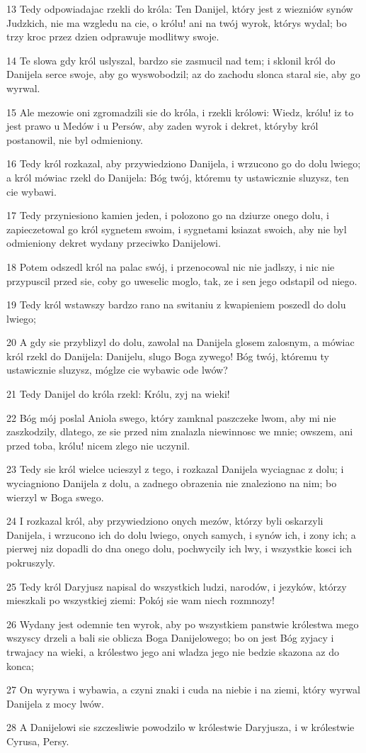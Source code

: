 \par 13 Tedy odpowiadajac rzekli do króla: Ten Danijel, który jest z wiezniów synów Judzkich, nie ma wzgledu na cie, o królu! ani na twój wyrok, którys wydal; bo trzy kroc przez dzien odprawuje modlitwy swoje.
\par 14 Te slowa gdy król uslyszal, bardzo sie zasmucil nad tem; i sklonil król do Danijela serce swoje, aby go wyswobodzil; az do zachodu slonca staral sie, aby go wyrwal.
\par 15 Ale mezowie oni zgromadzili sie do króla, i rzekli królowi: Wiedz, królu! iz to jest prawo u Medów i u Persów, aby zaden wyrok i dekret, któryby król postanowil, nie byl odmieniony.
\par 16 Tedy król rozkazal, aby przywiedziono Danijela, i wrzucono go do dolu lwiego; a król mówiac rzekl do Danijela: Bóg twój, któremu ty ustawicznie sluzysz, ten cie wybawi.
\par 17 Tedy przyniesiono kamien jeden, i polozono go na dziurze onego dolu, i zapieczetowal go król sygnetem swoim, i sygnetami ksiazat swoich, aby nie byl odmieniony dekret wydany przeciwko Danijelowi.
\par 18 Potem odszedl król na palac swój, i przenocowal nic nie jadlszy, i nic nie przypuscil przed sie, coby go uweselic moglo, tak, ze i sen jego odstapil od niego.
\par 19 Tedy król wstawszy bardzo rano na switaniu z kwapieniem poszedl do dolu lwiego;
\par 20 A gdy sie przyblizyl do dolu, zawolal na Danijela glosem zalosnym, a mówiac król rzekl do Danijela: Danijelu, slugo Boga zywego! Bóg twój, któremu ty ustawicznie sluzysz, móglze cie wybawic ode lwów?
\par 21 Tedy Danijel do króla rzekl: Królu, zyj na wieki!
\par 22 Bóg mój poslal Aniola swego, który zamknal paszczeke lwom, aby mi nie zaszkodzily, dlatego, ze sie przed nim znalazla niewinnosc we mnie; owszem, ani przed toba, królu! nicem zlego nie uczynil.
\par 23 Tedy sie król wielce ucieszyl z tego, i rozkazal Danijela wyciagnac z dolu; i wyciagniono Danijela z dolu, a zadnego obrazenia nie znaleziono na nim; bo wierzyl w Boga swego.
\par 24 I rozkazal król, aby przywiedziono onych mezów, którzy byli oskarzyli Danijela, i wrzucono ich do dolu lwiego, onych samych, i synów ich, i zony ich; a pierwej niz dopadli do dna onego dolu, pochwycily ich lwy, i wszystkie kosci ich pokruszyly.
\par 25 Tedy król Daryjusz napisal do wszystkich ludzi, narodów, i jezyków, którzy mieszkali po wszystkiej ziemi: Pokój sie wam niech rozmnozy!
\par 26 Wydany jest odemnie ten wyrok, aby po wszystkiem panstwie królestwa mego wszyscy drzeli a bali sie oblicza Boga Danijelowego; bo on jest Bóg zyjacy i trwajacy na wieki, a królestwo jego ani wladza jego nie bedzie skazona az do konca;
\par 27 On wyrywa i wybawia, a czyni znaki i cuda na niebie i na ziemi, który wyrwal Danijela z mocy lwów.
\par 28 A Danijelowi sie szczesliwie powodzilo w królestwie Daryjusza, i w królestwie Cyrusa, Persy.

